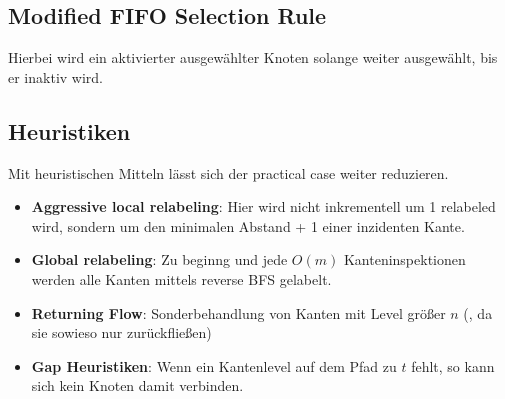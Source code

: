 \subsection{Modified FIFO Selection Rule}
Hierbei wird ein aktivierter ausgewählter Knoten solange weiter ausgewählt, bis er inaktiv wird.

\subsection{Heuristiken}
Mit heuristischen Mitteln lässt sich der practical case weiter reduzieren. 

\begin{itemize}
	\item \textbf{Aggressive local relabeling}: Hier wird nicht inkrementell um 1 relabeled wird, sondern um den minimalen Abstand + 1 einer inzidenten Kante. \\
	\item \textbf{Global relabeling}: Zu beginng und jede $O(m)$ Kanteninspektionen werden alle Kanten mittels reverse BFS gelabelt. \\
	\item \textbf{Returning Flow}: Sonderbehandlung von Kanten mit Level größer $n$ (, da sie sowieso nur zurückfließen) \\
	\item \textbf{Gap Heuristiken}: Wenn ein Kantenlevel auf dem Pfad zu $t$ fehlt, so kann sich kein Knoten damit verbinden.
\end{itemize}
